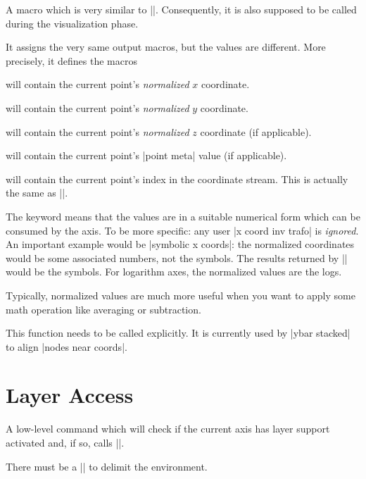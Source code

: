 \begin{command}{\pgfplotspointgetnormalizedcoordinates}
    A macro which is very similar to |\pgfplotspointgetcoordinates|.
    Consequently, it is also supposed to be called during the visualization phase.

    It assigns the very same output macros, but the values are different. More
    precisely, it defines the macros

     will contain the current point's
    \emph{normalized} $x$ coordinate.

     will contain the current point's
    \emph{normalized} $y$ coordinate.

     will contain the current point's
    \emph{normalized} $z$ coordinate (if applicable).

     will contain the current point's
    |point meta| value (if applicable).

     will contain the current point's index in
    the coordinate stream. This is actually the same as |\coordindex|.

    The keyword  means that the values are in a
    suitable numerical form which can be consumed by the axis. To be more
    specific: any user |x coord inv trafo| is \emph{ignored}. An important
    example would be |symbolic x coords|: the normalized coordinates would be
    some associated numbers, not the symbols. The results returned by
    |\pgfplotspointgetcoordinates| would be the symbols. For logarithm axes,
    the normalized values are the logs.

    Typically, normalized values are much more useful when you want to apply
    some math operation like averaging or subtraction.

    This function needs to be called explicitly. It is currently used by
    |ybar stacked| to align |nodes near coords|.
\end{command}


\section{Layer Access}

\begin{command}{\pgfplotsonlayer{}}
    A low-level command which will check if the current axis has layer support
    activated and, if so, calls |\pgfonlayer|.

    There must be a |\endpgfplotsonlayer| to delimit the environment.
\end{command}

